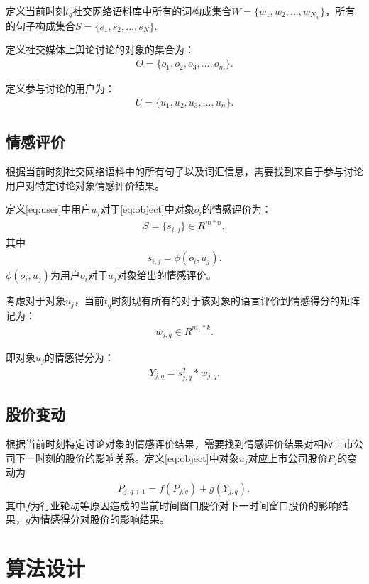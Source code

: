 \documentclass[UTF8]{csoarticle}
\begin{document}
定义当前时刻$t_q$社交网络语料库中所有的词构成集合$W=\{w_1,w_2,...,w_{N_w} \}$，所有的句子构成集合$S=\{s_1,s_2,...,s_N \}$.

定义社交媒体上舆论讨论的对象的集合为：
\begin{align}\label{eq:object}
O=\{o_1,o_2,o_3,... ,o_m \}.
\end{align}

定义参与讨论的用户为：
\begin{align}\label{eq:user}
U=\{u_1,u_2,u_3,..., u_n \}.
\end{align}

\subsection{情感评价}
根据当前时刻社交网络语料中的所有句子以及词汇信息，需要找到来自于参与讨论用户对特定讨论对象情感评价结果。

定义\eqref{eq:user}中用户$u_j$对于\eqref{eq:object}中对象$o_i$的情感评价为：
\begin{align}\label{eq:sentiments}
S=\{s_{i,j} \}\in R^{m*n},
\end{align}
其中
\begin{align}\label{eq:sentiment}
s_{i,j}=\phi(o_i,u_j).
\end{align}
$\phi(o_i,u_j)$为用户$o_i$对于$u_j$对象给出的情感评价。

考虑对于对象$u_j$，当前$t_q$时刻现有所有的对于该对象的语言评价到情感得分的矩阵记为：
\begin{align}\label{eq:sentimentMatrix}
w_{j,q}\in R^{m_1*k }.
\end{align}

即对象$u_j$的情感得分为：
\begin{align}\label{eq:sentimentScore}
Y_{j,q}=s_{j,q}^T*w_{j,q}.
\end{align}

\subsection{股价变动}
根据当前时刻特定讨论对象的情感评价结果，需要找到情感评价结果对相应上市公司下一时刻的股价的影响关系。定义\eqref{eq:object}中对象$u_j$对应上市公司股价$P_j$的变动为
\begin{align}\label{eq:stockVariations}
P_{j,q+1}=f(P_{j,q} )+g(Y_{j,q}),
\end{align}
其中$f$为行业轮动等原因造成的当前时间窗口股价对下一时间窗口股价的影响结果，$g$为情感得分对股价的影响结果。

\section{算法设计}
\end{document}
